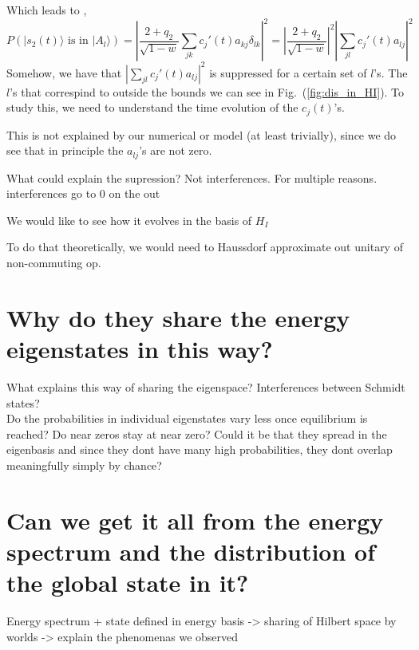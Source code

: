 \documentclass{article}
\begin{document}
Which leads to ,
\begin{equation}
    P(|s_2(t)\rangle \text{ is in } |A_l\rangle) = |\frac{2+q_2}{\sqrt{1-w}}\sum_{jk}c_j'(t)a_{kj}\delta_{lk}|^2 = |\frac{2+q_2}{\sqrt{1-w}}|^2|\sum_{jl}c_j'(t)a_{lj}|^2
\end{equation}
Somehow, we have that $|\sum_{jl}c_j'(t)a_{lj}|^2$ is suppressed for a certain set of $l$'s. The $l$'s that correspind to outside the bounds we can see in Fig.~(\ref{fig:dis_in_HI}). To study this, we need to understand the time evolution of the $c_j(t)$'s.

This is not explained by our numerical or model (at least trivially), since we do see that in principle the $a_{lj}$'s are not zero.

What could explain the supression? Not interferences. For multiple reasons. interferences go to 0 on the out


We would like to see how it evolves in the basis of $H_I$

To do that theoretically, we would need to Haussdorf approximate out unitary of non-commuting op.


\newpage


\section{Why do they share the energy eigenstates in this way?}
 

What explains this way of sharing the eigenspace? Interferences between Schmidt states? \\

{\color{teal} Do the probabilities in individual eigenstates vary less once equilibrium is reached? Do near zeros stay at near zero? Could it be that they spread in the eigenbasis and since they dont have many high probabilities, they dont overlap meaningfully simply by chance?}

\section{Can we get it all from the energy spectrum and the distribution of the global state in it?}

Energy spectrum + state defined in energy basis -> sharing of Hilbert space by worlds -> explain the phenomenas we observed
\end{document}
